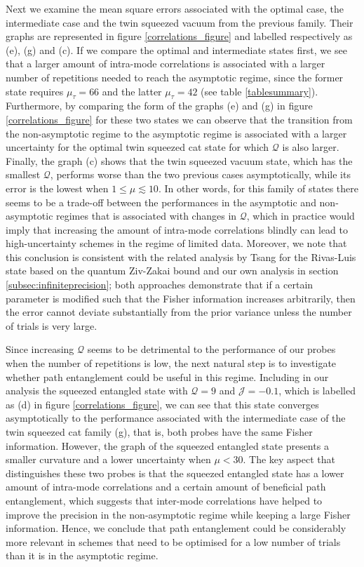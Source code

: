 Next we examine the mean square errors associated with the optimal case, the intermediate case and the twin squeezed vacuum from the previous family. Their graphs are represented in figure \ref{correlations_figure} and labelled respectively as (e), (g) and (c). If we compare the optimal and intermediate states first, we see that a larger amount of intra-mode correlations is associated with a larger number of repetitions needed to reach the asymptotic regime, since the former state requires $\mu_\tau=66$ and the latter $\mu_\tau=42$ (see table \ref{tablesummary}). Furthermore, by comparing the form of the graphs (e) and (g) in figure \ref{correlations_figure} for these two states we can observe that the transition from the non-asymptotic regime to the asymptotic regime is associated  with a larger uncertainty for the optimal twin squeezed cat state for which $\mathcal{Q}$ is also larger. Finally, the graph (c) shows that the twin squeezed vacuum state, which has the smallest $\mathcal{Q}$, performs worse than the two previous cases asymptotically, while its error is the lowest when $1\leqslant\mu \lesssim 10$. In other words, for this family of states there seems to be a trade-off between the performances in the asymptotic and non-asymptotic regimes that is associated with changes in $\mathcal{Q}$, which in practice would imply that increasing the amount of intra-mode correlations blindly can lead to high-uncertainty schemes in the regime of limited data. Moreover, we note that this conclusion is consistent with the related analysis by Tsang \cite{tsang2012} for the Rivas-Luis state \cite{rivas2012} based on the quantum Ziv-Zakai bound and our own analysis in section \ref{subsec:infiniteprecision}; both approaches demonstrate that if a certain parameter is modified such that the Fisher information increases arbitrarily, then the error cannot deviate substantially from the prior variance unless the number of trials is very large. 

Since increasing $\mathcal{Q}$ seems to be detrimental to the performance of our probes when the number of repetitions is  low, the next natural step is to investigate whether path entanglement could be useful in this regime. Including in our analysis the squeezed entangled state with $\mathcal{Q} = 9$ and $\mathcal{J}=-0.1$, which is labelled as (d) in figure \ref{correlations_figure}, we can see that this state converges asymptotically to the performance associated with the intermediate case of the twin squeezed cat family (g), that is, both probes have the same Fisher information. However, the graph of the squeezed entangled state presents a smaller curvature and a lower uncertainty when $\mu < 30$. The key aspect that distinguishes these two probes is that the squeezed entangled state has a lower amount of intra-mode correlations and a certain amount of beneficial path entanglement, which suggests that inter-mode correlations have helped to improve the precision in the non-asymptotic regime while keeping a large Fisher information. Hence, we conclude that path entanglement could be considerably more relevant in schemes that need to be optimised for a low number of trials than it is in the asymptotic regime. 

